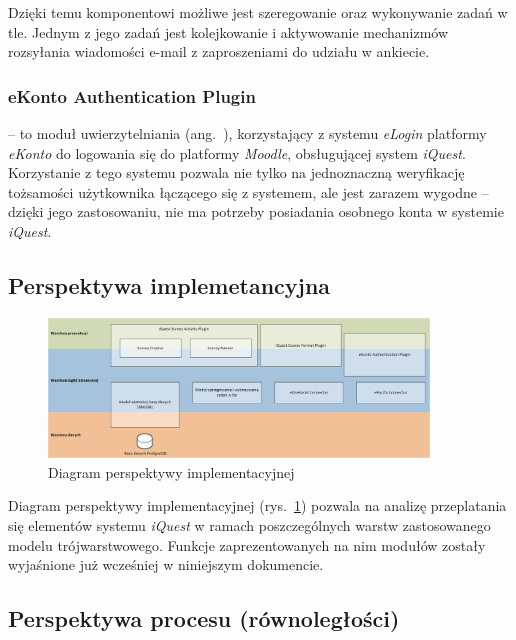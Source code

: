 Dzięki temu komponentowi możliwe jest szeregowanie oraz wykonywanie zadań w tle. Jednym z jego zadań jest kolejkowanie i aktywowanie mechanizmów rozsyłania wiadomości e-mail z zaproszeniami do udziału w ankiecie.

\subsubsection{eKonto Authentication Plugin}
\label{Chapter5425}

 -- to moduł uwierzytelniania (ang.~), korzystający z systemu \textit{eLogin} platformy \textit{eKonto} do logowania się do platformy \textit{Moodle}, obsługującej system \textit{iQuest}. Korzystanie z tego systemu pozwala nie tylko na jednoznaczną weryfikację tożsamości użytkownika łączącego się z systemem, ale jest zarazem wygodne -- dzięki jego zastosowaniu, nie ma potrzeby posiadania osobnego konta w systemie \textit{iQuest}.

\subsection{Perspektywa implemetancyjna}
\label{Chapter543}

\begin{figure}[H]
\centering\includegraphics[width=0.9\textwidth]{figures/Layers}
\caption{Diagram perspektywy implementacyjnej}\label{rys:PerspektywaImplementacyjna}
\end{figure}

Diagram perspektywy implementacyjnej (rys.~\ref{rys:PerspektywaImplementacyjna}) pozwala na analizę przeplatania się elementów systemu \textit{iQuest} w ramach poszczególnych warstw zastosowanego modelu trójwarstwowego. Funkcje zaprezentowanych na nim modułów zostały wyjaśnione już wcześniej w niniejszym dokumencie.

\subsection{Perspektywa procesu (równoległości)}
\label{Chapter544}

